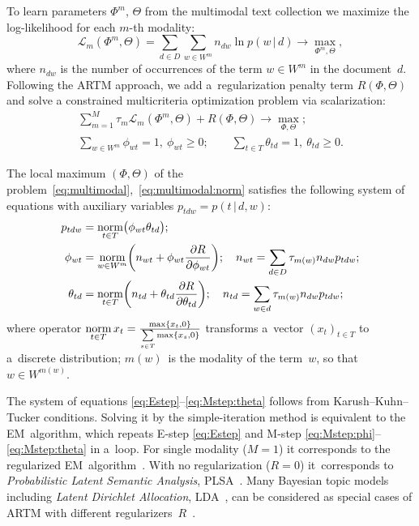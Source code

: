 \documentclass[russian,english]{llncs}
\newcommand{\norm}{\mathop{\rm norm}\limits}
\newcommand{\cond}{\mspace{3mu}{|}\mspace{3mu}}
\newcommand{\cL}{\mathscr{L}}
\begin{document}
To learn parameters $\Phi^m$, $\Theta$ from the multimodal text collection
we maximize the log-likelihood for each $m$-th modality:
\[
    \cL_m (\Phi^m,\Theta) =
    \sum_{d\in D}\sum_{w\in W^m} n_{dw} \ln p(w\cond d)
    \to \max_{\Phi^m,\Theta},
\]
where
$n_{dw}$ is the number of occurrences of the term $w\in W^m$ in the document~$d$.
Following the ARTM approach,
we add a~regularization penalty term $R(\Phi,\Theta)$
and solve a constrained multicriteria optimization problem via scalarization:
\begin{gather}
\label{eq:multimodal}
    \sum_{m=1}^M \tau_m \cL_m (\Phi^m,\Theta)
    + R(\Phi,\Theta)
    \to \max_{\Phi,\Theta};
\\\label{eq:multimodal:norm}
    \sum_{w\in W^m}\!\!\! \phi_{wt} = 1,~
    \phi_{wt}\geq 0;
    \qquad
    \sum_{t\in T} \theta_{td} = 1,~
    \theta_{td}\geq 0.
\end{gather}

The local maximum $(\Phi,\Theta)$
of the problem~\eqref{eq:multimodal},~\eqref{eq:multimodal:norm}
satisfies the following system of equations
with auxiliary variables $p_{tdw} = p(t\cond d,w)$:
\begin{align}
    \label{eq:Estep}
    p_{tdw} &= \norm_{t\in T} \bigl(\phi_{wt}\theta_{td}\bigr);
\\
    \label{eq:Mstep:phi}
    \phi_{wt} &= \norm_{w\in W^m}
        \biggl(
            n_{wt} + \phi_{wt} \frac{\partial R}{\partial \phi_{wt}}
        \biggr);
    \quad
    n_{wt} = \sum_{d\in D} \tau_{m(w)} n_{dw} p_{tdw};
\\
    \label{eq:Mstep:theta}
    \theta_{td} &= \norm_{t\in T}
        \biggl(
            n_{td} + \theta_{td} \frac{\partial R}{\partial \theta_{td}}
        \biggr);
    \quad
    n_{td} = \sum_{w\in d} \tau_{m(w)} n_{dw} p_{tdw};
\end{align}
where operator
$\norm_{t\in T} x_t = \frac{\max\{x_t,0\}}{\sum\limits_{s\in T} \max\{x_s,0\}}$
transforms a~vector $(x_t)_{t\in T}$ to a~discrete distribution;
$m(w)$~is the modality of the term~$w$, so that $w\in W^{m(w)}$.

The system of equations \eqref{eq:Estep}--\eqref{eq:Mstep:theta}
follows from Karush--Kuhn--Tucker conditions.
Solving it by the simple-iteration method is equivalent to the EM~algorithm,
which repeats 
E-step \eqref{eq:Estep} and
M-step \eqref{eq:Mstep:phi}--\eqref{eq:Mstep:theta}
in a~loop.
For single modality (${M=1}$) it corresponds to the regularized EM~algorithm~\cite{voron14dan-eng}.
With no regularization (${R=0}$) it~corresponds to 
\emph{Probabilistic Latent Semantic Analysis}, PLSA~\cite{hofmann99plsi}.
Many Bayesian topic models 
including \emph{Latent Dirichlet Allocation}, LDA~\cite{blei03latent},
can be considered as special cases of ARTM with different regularizers~$R$~\cite{voron14mlj,voron14aist}.
\end{document}
